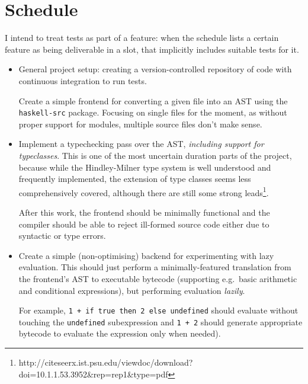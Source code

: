 \documentclass[12pt]{article}
\newcommand\haskell[1]{\texttt{#1}}
\newcommand\monospace[1]{\texttt{#1}}
\begin{document}
\section*{Schedule}

I intend to treat tests as part of a feature: when the schedule lists a certain feature as being deliverable in a slot,
that implicitly includes suitable tests for it.




\begin{itemize}
\item
{

    General project setup: creating a version-controlled repository of code with continuous integration to run tests.

    Create a simple frontend for converting a given file into an AST using the \monospace{haskell-src} package. Focusing
    on single files for the moment, as without proper support for modules, multiple source files don't make sense.
}
\item
{

    Implement a typechecking pass over the AST, \textit{including support for typeclasses}. This is one of the most
    uncertain duration parts of the project, because while the Hindley-Milner type system is well understood and
    frequently implemented, the extension of type classes seems less comprehensively covered, although there are still
    some strong leads\footnote{http://citeseerx.ist.psu.edu/viewdoc/download?doi=10.1.1.53.3952\&rep=rep1\&type=pdf}.

    After this work, the frontend should be minimally functional and the compiler should be able to reject ill-formed
    source code either due to syntactic or type errors.
}
\item
{

    Create a simple (non-optimising) backend for experimenting with lazy evaluation. This should just perform a
    minimally-featured translation from the frontend's AST to executable bytecode (supporting e.g.\ basic arithmetic and
    conditional expressions), but performing evaluation \textit{lazily}.

    For example, \haskell{1 + if true then 2 else undefined} should evaluate without touching the \haskell{undefined}
    subexpression and \haskell{1 + 2} should generate appropriate bytecode to evaluate the expression only when needed).

}
\end{itemize}
\end{document}
